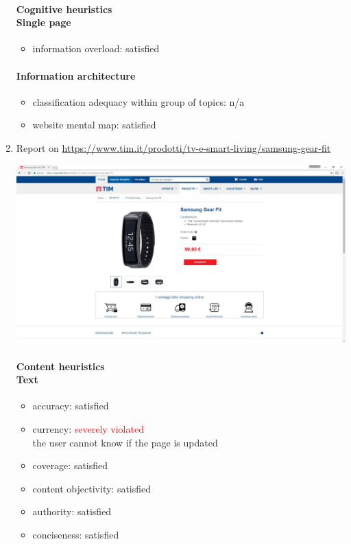 \begin{enumerate}
	\paragraph*{Cognitive heuristics \\ Single page}
	\begin{itemize}
		\item information overload: satisfied
	\end{itemize}	

	\paragraph*{Information architecture}
	\begin{itemize}
		\item classification adequacy within group of topics: n/a
		\item website mental map: satisfied
	\end{itemize}
\newpage


\item Report on \url{https://www.tim.it/prodotti/tv-e-smart-living/samsung-gear-fit}

\begin{center}
	\includegraphics[width=\textwidth]{Screenshot/gear.jpg}
\end{center}
\vspace{1cm}

	\paragraph*{Content heuristics \\ Text}
	\begin{itemize}
		\item accuracy: satisfied
		\item currency: \textcolor{red}{severely violated}\\
		the user cannot know if the page is updated
		\item coverage: satisfied
		\item content objectivity: satisfied
		\item authority: satisfied
		\item conciseness: satisfied		
	\end{itemize}


\end{enumerate}
